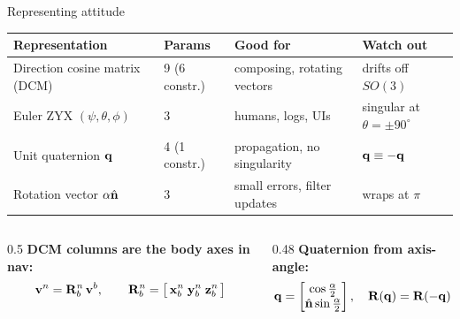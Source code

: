 \begin{frame}{Representing attitude}
  \footnotesize\setlength{\tabcolsep}{4pt}
  \begin{tabular}{@{}llll@{}}
    \toprule
    Representation & Params & Good for & Watch out \\
    \midrule
    Direction cosine matrix (DCM) & 9 (6 constr.) & composing, rotating vectors & drifts off $SO(3)$ \\
    Euler ZYX $(\psi,\theta,\phi)$ & 3 & humans, logs, UIs & singular at $\theta=\pm90^\circ$ \\
    Unit quaternion $\mathbf{q}$ & 4 (1 constr.) & propagation, no singularity & $\mathbf{q}\equiv-\mathbf{q}$ \\
    Rotation vector $\alpha\hat{\mathbf{n}}$ & 3 & small errors, filter updates & wraps at $\pi$ \\
    \bottomrule
  \end{tabular}
  \vspace{1.8em}

  \begin{columns}[T]
    \begin{column}{0.5\textwidth}
      \textbf{DCM columns are the body axes in nav:}
      \[
        \mathbf{v}^n = \mathbf{R}^n_b\,\mathbf{v}^b,\qquad
        \mathbf{R}^n_b = \big[\,\mathbf{x}_b^n\;\mathbf{y}_b^n\;\mathbf{z}_b^n\,\big]
      \]
    \end{column}
    \begin{column}{0.48\textwidth}
      \textbf{Quaternion from axis-angle:}
      \[
        \mathbf{q} = \begin{bmatrix}\cos\frac{\alpha}{2}\\ \hat{\mathbf{n}}\sin\frac{\alpha}{2}\end{bmatrix},\quad
        \mathbf{R}(\mathbf{q}) = \mathbf{R}(-\mathbf{q})
      \]
    \end{column}
  \end{columns}
\end{frame}


